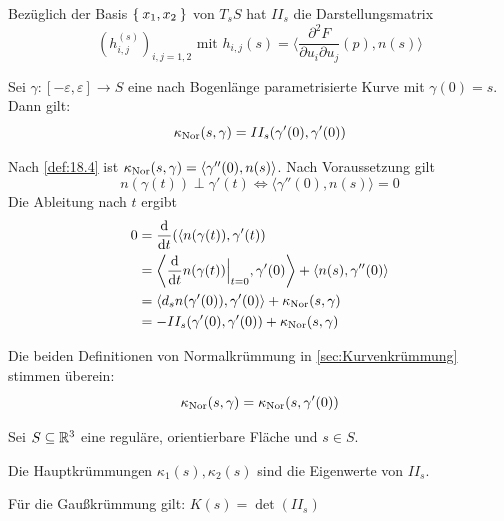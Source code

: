 \begin{bemerkung}%
    Bezüglich der Basis $\Set{x_1, x_2}$ von $T_s S$ hat $II_s$ die Darstellungsmatrix
    \[(h^{(s)}_{i,j})_{i,j=1,2} \text{ mit } h_{i,j}(s) = \langle \frac{\partial^2 F}{\partial u_i \partial u_j} (p), n(s) \rangle \]
\end{bemerkung}

\begin{proposition}\label{prop:19.6}%
    Sei $\gamma:[- \varepsilon, \varepsilon] \rightarrow S$ eine nach Bogenlänge
    parametrisierte Kurve mit $\gamma(0) = s$. Dann gilt:
    \[\kappa_{\textnormal{Nor}}(s, \gamma) = II_s(\gamma'(0), \gamma'(0))\]
\end{proposition}

\begin{beweis}
    Nach \cref{def:18.4} ist $\kappa_{\textnormal{Nor}}(s, \gamma) = \langle \gamma''(0), n(s) \rangle$.
    Nach Voraussetzung gilt 
    \[n(\gamma(t)) \perp \gamma'(t) \Leftrightarrow \langle \gamma''(0), n(s) \rangle = 0\]
    Die Ableitung nach $t$ ergibt 
    \begin{align*}
        0 &= \frac{\mathrm{d}}{\mathrm{d}t}(\langle n (\gamma(t)), \gamma'(t))\\
        &= \left \langle \frac{\mathrm{d}}{\mathrm{d}t} n(\gamma(t)) \Bigr |_{t=0}, \gamma'(0) \right \rangle + \langle n(s), \gamma''(0) \rangle\\
        &= \langle d_s n (\gamma'(0)), \gamma'(0) \rangle + \kappa_{\textnormal{Nor}}(s,\gamma)\\
        &= - II_s(\gamma'(0), \gamma'(0)) + \kappa_{\textnormal{Nor}}(s, \gamma)
    \end{align*}
\end{beweis}

\begin{folgerung}%
    Die beiden Definitionen von Normalkrümmung in \cref{sec:Kurvenkrümmung} stimmen
    überein:
    \[\kappa_{\textnormal{Nor}}(s, \gamma) = \kappa_{\textnormal{Nor}}(s, \gamma'(0))\]
\end{folgerung}

\begin{satz}%
    Sei $S \subseteq \mathbb{R}^3$ eine reguläre, orientierbare Fläche und $s \in S$.
    \begin{satzenum}
        \item Die Hauptkrümmungen $\kappa_1(s), \kappa_2(s)$ sind die Eigenwerte
              von $II_s$.
        \item Für die Gaußkrümmung gilt: $K(s) = \det(II_s)$
    \end{satzenum}
\end{satz}

